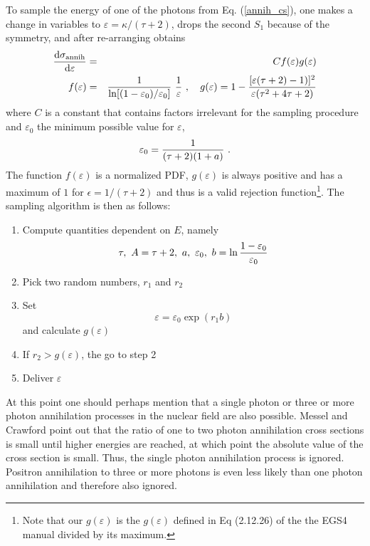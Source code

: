 To sample the energy of one of the photons from 
Eq. (\ref{annih_cs}), one makes a change in variables 
to $\varepsilon = \kappa/(\tau+2)$, drops the second 
$S_1$ because of the symmetry, and after re-arranging obtains
\begin{eqnarray}
{{\rm d} \sigma_{\rm annih} \over {\rm d}\varepsilon} & = & 
C f(\varepsilon) g(\varepsilon) \\
f(\varepsilon) & = & {1 \over \ln[(1-\varepsilon_0)/\varepsilon_0]}~
\frac{1}{\varepsilon}~, \quad 
g(\varepsilon) = 1 - {[\varepsilon (\tau+2) - 1) ]^2 \over \varepsilon 
(\tau^2 + 4 \tau + 2) }
\end{eqnarray}
where $C$ is a constant that contains factors irrelevant for 
the sampling procedure and $\varepsilon_0$ the minimum 
possible value for $\varepsilon$,
\begin{equation}
\varepsilon_0 = {1 \over (\tau+2) (1 + a)}~.
\end{equation}
The function $f(\varepsilon)$ is a normalized PDF, $g(\varepsilon)$ 
is always positive and 
has a maximum
of $1$ for $\epsilon = 1/(\tau+2)$ and 
thus is a valid rejection function\footnote{Note that our $g(\varepsilon)$ is 
the $g(\varepsilon)$ defined in Eq (2.12.26) of the the EGS4 manual 
divided by its maximum.}. The sampling algorithm is then as follows:
\begin{enumerate}
\item
Compute quantities dependent on $E$, namely
\begin{displaymath}
\tau,~A = \tau+2,~a,~\varepsilon_0,~
b = \ln{1 - \varepsilon_0 \over \varepsilon_0}
\end{displaymath}
\item
Pick two random numbers, $r_1$ and $r_2$
\item
Set 
\begin{equation}
\varepsilon = \varepsilon_0 \exp\left(r_1 b\right)
\end{equation}
and calculate $g(\varepsilon)$
\item
If $r_2 > g(\varepsilon)$, the go to step 2
\item
Deliver $\varepsilon$
\end{enumerate}

At this point 
one should perhaps mention that a single photon or three or more 
photon annihilation processes in the nuclear field are also 
possible. Messel and Crawford \cite{MC70} point out that 
the ratio of one to two photon annihilation cross sections is small 
until higher energies are reached, at which point the absolute 
value of the cross section is small. Thus, the single 
photon annihilation process is ignored. Positron annihilation to 
three or more photons is even less likely than one photon 
annihilation and therefore also ignored.   

